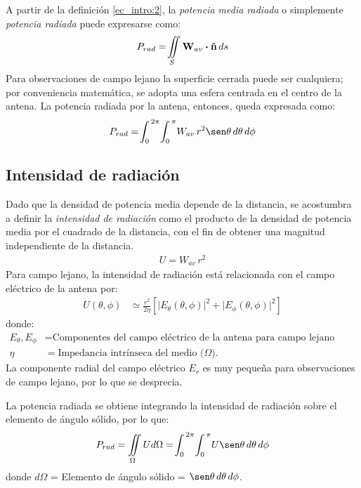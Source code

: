A partir de la definición \eqref{ec_intro:2}, la \emph{potencia media radiada} o simplemente \emph{potencia radiada} puede expresarse como:
\begin{align}
P_{rad} = \!\iint\limits_{S}\mathbf{W}_{av}\boldsymbol{\cdot}\bm{\mathbf{\hat{n}}}\,ds
\label{ec_intro:4}
\end{align}
Para observaciones de campo lejano la superficie cerrada puede ser cualquiera; por conveniencia matemática, se adopta una esfera centrada en el centro de la antena. La potencia radiada por la antena, entonces, queda expresada como:
\begin{align}
P_{rad} = \!\int_0^{\,2\pi}\!\int_0^{\,\pi}\!W_{av}\,r^2\sen\theta\,d\theta\,d\phi
\label{ec_intro:5}
\end{align}

\subsection{Intensidad de radiación}
\label{subsec_intro_int_rad}

Dado que la densidad de potencia media depende de la distancia, se acostumbra a definir la \emph{intensidad de radiación} como el producto de la densidad de potencia media por el cuadrado de la distancia, con el fin de obtener una magnitud independiente de la distancia.
\begin{align}
U = W_{av}\,r^2
\label{ec_intro:6}
\end{align}
Para campo lejano, la intensidad de radiación está relacionada con el campo eléctrico de la antena por:
\begin{align}
U\left(\theta,\phi\right) &\simeq \frac{r^2}{2\eta}\left[\lvert E_{\theta}\left(\theta,\phi\right)\rvert^2 + \lvert E_{\phi}\left(\theta,\phi\right)\rvert^2\right]
\label{ec_intro:7}
\end{align}
donde:
\begin{align*}
E_{\theta}, E_{\phi} &= \text{Componentes del campo eléctrico de la antena para campo lejano (V/m).}\\
\eta &= \text{Impedancia intrínseca del medio ($\Omega$).}
\end{align*}
La componente radial del campo eléctrico $E_r$ es muy pequeña para observaciones de campo lejano, por lo que se desprecia.

La potencia radiada se obtiene integrando la intensidad de radiación sobre el elemento de ángulo sólido, por lo que:
\begin{align}
P_{rad} = \iint\limits_{\Omega}Ud\Omega = \!\int_0^{\,2\pi}\!\int_0^{\,\pi}\!U\sen\theta\,d\theta\,d\phi
\label{ec_intro:8}
\end{align}
donde $d\Omega$ = Elemento de ángulo sólido = $\sen\theta\,d\theta\,d\phi$.

